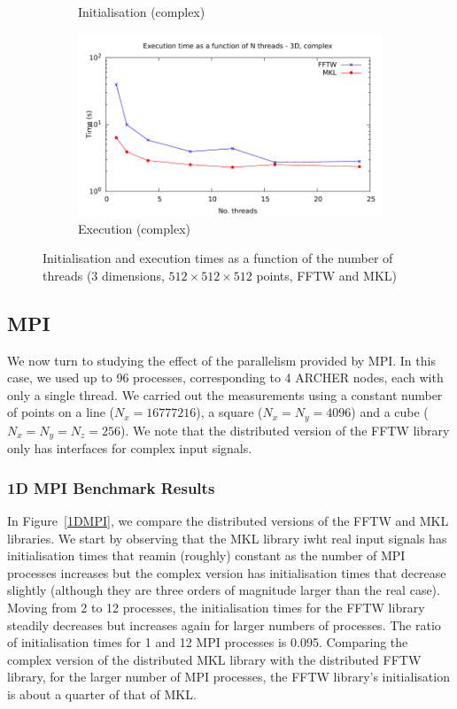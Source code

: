 \documentclass[12pt, a4paper]{article} \setlength{\textheight}{24cm}
\begin{document}
\begin{figure}[H]
\begin{subfigure}{.5\textwidth}
    \caption{Initialisation (complex)}
    \label{3DMULTHCI}
  \end{subfigure}%
  \begin{subfigure}{.5\textwidth}
    \centering
    \includegraphics[width=.9\linewidth]{graphs/3d-multh-exec-c.pdf}
    \caption{Execution (complex)}
    \label{3DMULTHCR}
  \end{subfigure}
  \caption{Initialisation and execution times as a function of the
    number of threads (3 dimensions, $512 \times 512\times 512$
    points, FFTW and MKL)}
  \label{3DMTHREAD}
\end{figure}

\subsection{MPI}\label{MPI}
We now turn to studying the effect of the parallelism provided by MPI.
In this case, we used up to 96 processes, corresponding to 4 ARCHER
nodes, each with only a single thread. We carried out the measurements
using a constant number of points on a line ($N_x=16777216$), a square
($N_x=N_y=4096$) and a cube ($N_x=N_y=N_z=256$). We note that the
distributed version of the FFTW library only has interfaces for
complex input signals.


\subsubsection{1D MPI Benchmark Results}
In Figure~\ref{1DMPI}, we compare the distributed versions of the FFTW
and MKL libraries. We start by observing that the MKL library iwht
real input signals has initialisation times that reamin (roughly)
constant as the number of MPI processes increases but the complex
version has initialisation times that decrease slightly (although they
are three orders of magnitude larger than the real case). Moving from
2 to 12 processes, the initialisation times for the FFTW library
steadily decreases but increases again for larger numbers of
processes. The ratio of initialisation times for 1 and 12 MPI
processes is 0.095. Comparing the complex version of the distributed
MKL library with the distributed FFTW library, for the larger number
of MPI processes, the FFTW library's initialisation is about a quarter
of that of MKL.
\end{document}
